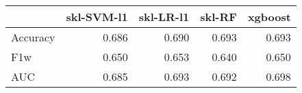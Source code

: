 \begin{tabular}{lrrrr}
\toprule
{} &  skl-SVM-l1 &  skl-LR-l1 &  skl-RF &  xgboost \\
\midrule
Accuracy &       0.686 &      0.690 &   0.693 &    0.693 \\
F1w      &       0.650 &      0.653 &   0.640 &    0.650 \\
AUC      &       0.685 &      0.693 &   0.692 &    0.698 \\
\bottomrule
\end{tabular}
